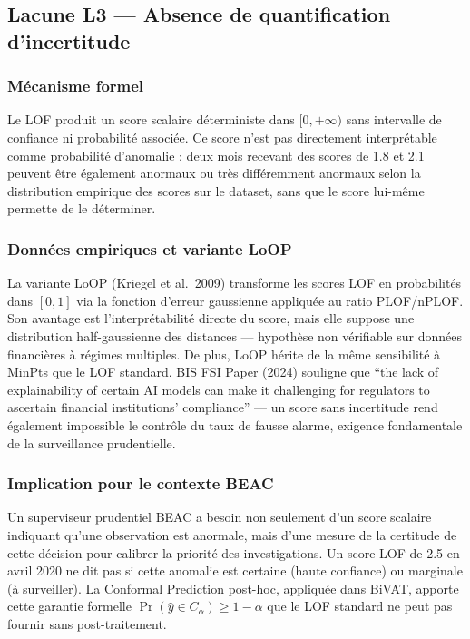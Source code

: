 \documentclass[12pt,a4paper]{article}
\begin{document}
\subsection{Lacune L3 --- Absence de quantification d'incertitude}

\subsubsection{Mécanisme formel}

Le LOF produit un score scalaire déterministe dans $[0, +\infty)$ sans
intervalle de confiance ni probabilité associée. Ce score n'est pas
directement interprétable comme probabilité d'anomalie : deux mois recevant
des scores de 1.8 et 2.1 peuvent être également anormaux ou très différemment
anormaux selon la distribution empirique des scores sur le dataset, sans que
le score lui-même permette de le déterminer.

\subsubsection{Données empiriques et variante LoOP}

La variante LoOP (Kriegel et al.\ 2009) transforme les scores LOF en
probabilités dans $[0,1]$ via la fonction d'erreur gaussienne appliquée
au ratio PLOF/nPLOF. Son avantage est l'interprétabilité directe du score,
mais elle suppose une distribution half-gaussienne des distances --- hypothèse
non vérifiable sur données financières à régimes multiples. De plus, LoOP
hérite de la même sensibilité à MinPts que le LOF standard. BIS FSI Paper
(2024) souligne que ``the lack of explainability of certain AI models can make
it challenging for regulators to ascertain financial institutions' compliance''
--- un score sans incertitude rend également impossible le contrôle du taux
de fausse alarme, exigence fondamentale de la surveillance prudentielle.

\subsubsection{Implication pour le contexte BEAC}

Un superviseur prudentiel BEAC a besoin non seulement d'un score scalaire
indiquant qu'une observation est anormale, mais d'une mesure de la certitude
de cette décision pour calibrer la priorité des investigations. Un score LOF
de 2.5 en avril 2020 ne dit pas si cette anomalie est certaine (haute confiance)
ou marginale (à surveiller). La Conformal Prediction post-hoc, appliquée dans
BiVAT, apporte cette garantie formelle $\Pr(\hat{y} \in C_\alpha) \geq 1 -
\alpha$ que le LOF standard ne peut pas fournir sans post-traitement.
\end{document}
